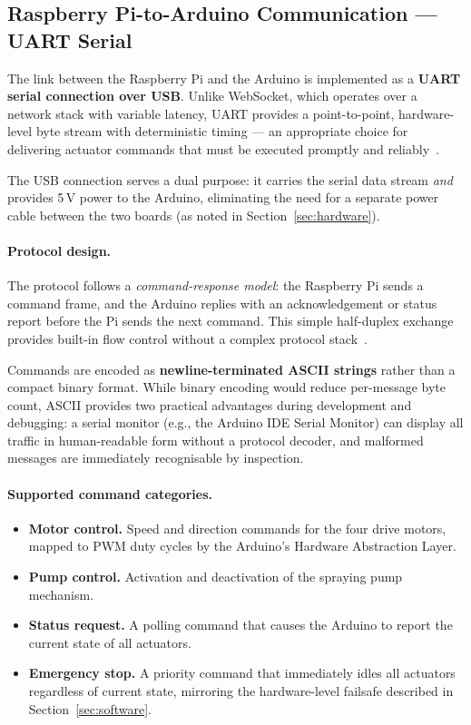 \subsection{Raspberry Pi-to-Arduino Communication — UART Serial}
 
The link between the Raspberry Pi and the Arduino is implemented as a
\textbf{UART serial connection over USB}. Unlike WebSocket, which
operates over a network stack with variable latency, UART provides a
point-to-point, hardware-level byte stream with deterministic
timing — an appropriate choice for delivering actuator commands that
must be executed promptly and reliably~\cite{axelson2007serial}.
 
The USB connection serves a dual purpose: it carries the serial data
stream \emph{and} provides 5\,V power to the Arduino, eliminating the
need for a separate power cable between the two boards (as noted in
Section~\ref{sec:hardware}).
 
\paragraph{Protocol design.}
The protocol follows a \emph{command-response model}: the Raspberry Pi
sends a command frame, and the Arduino replies with an acknowledgement
or status report before the Pi sends the next command. This simple
half-duplex exchange provides built-in flow control without a complex
protocol stack~\cite{axelson2007serial}.
 
Commands are encoded as \textbf{newline-terminated ASCII strings}
rather than a compact binary format. While binary encoding would reduce
per-message byte count, ASCII provides two practical advantages during
development and debugging: a serial monitor (e.g., the Arduino IDE
Serial Monitor) can display all traffic in human-readable form without
a protocol decoder, and malformed messages are immediately recognisable
by inspection.
 
\paragraph{Supported command categories.}
\begin{itemize}
    \item \textbf{Motor control.} Speed and direction commands for the
          four drive motors, mapped to PWM duty cycles by the
          Arduino's Hardware Abstraction Layer.
    \item \textbf{Pump control.} Activation and deactivation of the
          spraying pump mechanism.
    \item \textbf{Status request.} A polling command that causes the
          Arduino to report the current state of all actuators.
    \item \textbf{Emergency stop.} A priority command that immediately
          idles all actuators regardless of current state, mirroring
          the hardware-level failsafe described in
          Section~\ref{sec:software}.
\end{itemize}
 
